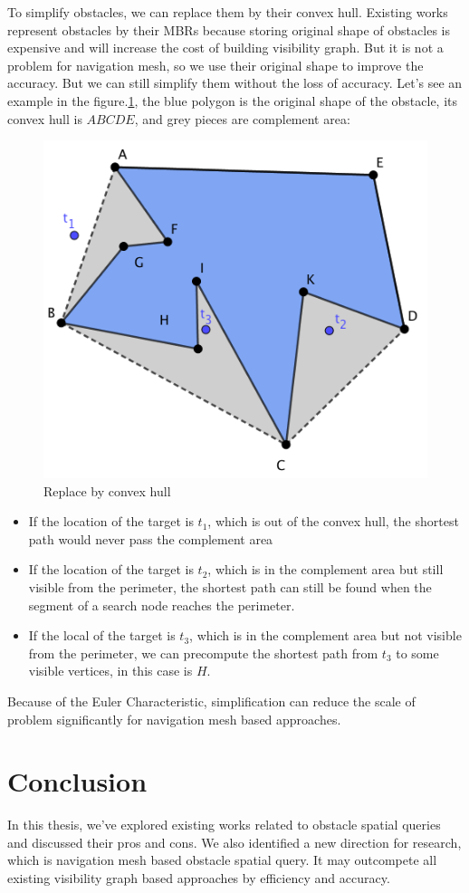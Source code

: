 To simplify obstacles, we can replace them by their convex hull.
Existing works represent obstacles by their MBRs because storing
original shape of obstacles is expensive and will increase the cost of
building visibility graph. But it is not a problem for navigation mesh, so we use their
original shape to improve the accuracy. But we can still simplify them without the loss of accuracy.
Let's see an example in the figure.\ref{convex}, the blue polygon is the original shape of
the obstacle, its convex hull is $ABCDE$, and grey pieces are complement area:
\begin{figure}[h]
  \centering
  \includegraphics[width=.6\linewidth]{pic/conv.png}
  \caption{Replace by convex hull}
  \label{convex}
\end{figure}
\begin{itemize}
  \item If the location of the target is $t_1$, which is out of the convex hull, the shortest path
    would never pass the complement area
  \item If the location of the target is $t_2$, which is in the complement area but still visible
    from the perimeter, the shortest path can still be found when the segment of a search node
    reaches the perimeter.
  \item If the local of the target is $t_3$, which is in the complement area but not visible from
    the perimeter, we can precompute the shortest path from $t_3$ to some visible vertices, in
    this case is $H$.
\end{itemize}
Because of the Euler Characteristic,
simplification can reduce the scale of problem significantly for navigation mesh based
approaches.

\section{Conclusion}
In this thesis, we've explored existing works related to obstacle spatial queries and discussed
their pros and cons. We also identified a new direction for research, which is navigation mesh
based obstacle spatial query. It may outcompete all existing visibility graph based approaches
by efficiency and accuracy.
